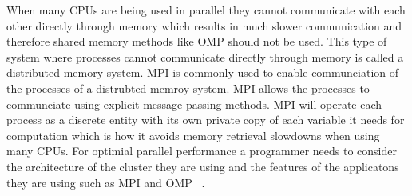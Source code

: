 \documentclass[preprint,11pt,authoryear]{elsarticle}
\begin{document}
When many CPUs are being used in parallel they cannot communicate with each 
other directly through memory which results in much slower communication and 
therefore shared memory methods like OMP should not be used. This type of 
system where processes cannot communicate directly through memory is called a 
distributed memory system. MPI is commonly used to enable communciation 
of the processes of a distrubted memroy system. MPI allows the processes 
to communciate using explicit  message passing methods. MPI will operate 
each process as a discrete entity with its own private copy of 
each variable it needs for computation which is how it avoids memory retrieval 
slowdowns when using many CPUs. For optimial parallel performance a programmer 
needs to consider the architecture of the cluster they are using and the 
features of the applicatons they are using such as MPI and OMP ~\citep{Adhianto2007}.  


\end{document}
